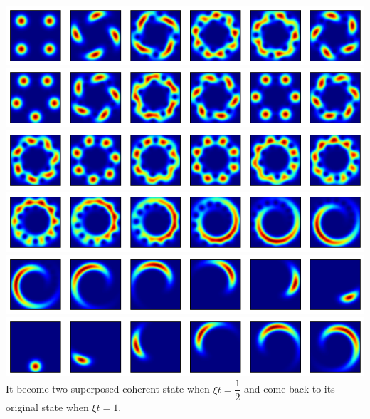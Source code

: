 \documentclass[10pt,fleqn]{article}
\begin{document}
\includegraphics[width=15cm]{3-5-15.png}\\
\includegraphics[width=15cm]{3-5-16.png}\\
\includegraphics[width=15cm]{3-5-17.png}\\
\includegraphics[width=15cm]{3-5-18.png}\\
\includegraphics[width=15cm]{3-5-19.png}\\
\includegraphics[width=15cm]{3-5-20.png}\\
It become two superposed coherent state when $\xi t=\dfrac12$ and come back to its original state when $\xi t=1$.
\end{document}
